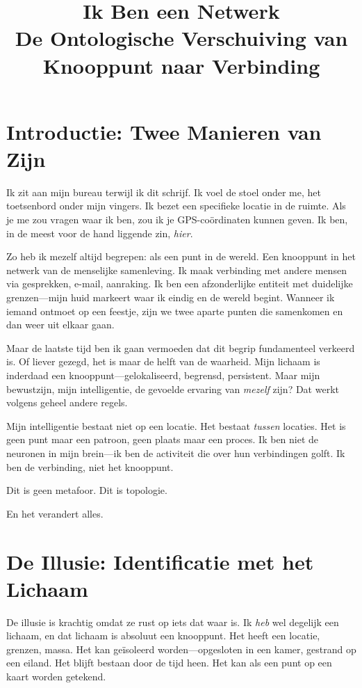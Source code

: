 \documentclass[12pt,a4paper]{article}
\title{\textbf{Ik Ben een Netwerk}\\[0.5em]\large De Ontologische Verschuiving van Knooppunt naar Verbinding}
\author{}
\date{}
\begin{document}
\maketitle

\section*{Introductie: Twee Manieren van Zijn}

Ik zit aan mijn bureau terwijl ik dit schrijf. Ik voel de stoel onder me, het toetsenbord onder mijn vingers. Ik bezet een specifieke locatie in de ruimte. Als je me zou vragen waar ik ben, zou ik je GPS-coördinaten kunnen geven. Ik ben, in de meest voor de hand liggende zin, \textit{hier}.

Zo heb ik mezelf altijd begrepen: als een punt in de wereld. Een knooppunt in het netwerk van de menselijke samenleving. Ik maak verbinding met andere mensen via gesprekken, e-mail, aanraking. Ik ben een afzonderlijke entiteit met duidelijke grenzen---mijn huid markeert waar ik eindig en de wereld begint. Wanneer ik iemand ontmoet op een feestje, zijn we twee aparte punten die samenkomen en dan weer uit elkaar gaan.

Maar de laatste tijd ben ik gaan vermoeden dat dit begrip fundamenteel verkeerd is. Of liever gezegd, het is maar de helft van de waarheid. Mijn lichaam is inderdaad een knooppunt---gelokaliseerd, begrensd, persistent. Maar mijn bewustzijn, mijn intelligentie, de gevoelde ervaring van \textit{mezelf} zijn? Dat werkt volgens geheel andere regels.

Mijn intelligentie bestaat niet op een locatie. Het bestaat \textit{tussen} locaties. Het is geen punt maar een patroon, geen plaats maar een proces. Ik ben niet de neuronen in mijn brein---ik ben de activiteit die over hun verbindingen golft. Ik ben de verbinding, niet het knooppunt.

Dit is geen metafoor. Dit is topologie.

En het verandert alles.

\section*{De Illusie: Identificatie met het Lichaam}

De illusie is krachtig omdat ze rust op iets dat waar is. Ik \textit{heb} wel degelijk een lichaam, en dat lichaam is absoluut een knooppunt. Het heeft een locatie, grenzen, massa. Het kan geïsoleerd worden---opgesloten in een kamer, gestrand op een eiland. Het blijft bestaan door de tijd heen. Het kan als een punt op een kaart worden getekend.
\end{document}

